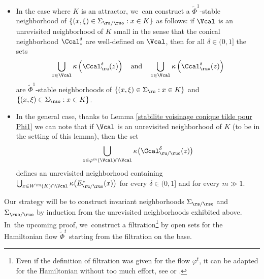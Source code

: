 \begin{itemize}
\item In the case where $K$ is an attractor, we~can construct a $\widetilde{\Phi}^1$-stable neighborhood of $\{(x,\xi)\in\Sigma_{\rs/\rso}: x\in K\}$ as follows: if $\Vcal$ is an unrevisited neighborhood of $K$ small in the sense that the conical neighborhood $\Ccal_*^{\delta}$ are well-defined on $\Vcal$, then for all $\delta\in(0,1]$ the sets
\[
\bigcup_{z \in \Vcal} \kappa \left(\Ccal_{\ru}^{\delta}(z) \right) \quad \text{and} \quad \bigcup_{z \in \Vcal} \kappa \left(\Ccal_{\ruo}^{\delta}(z) \right)
\]
are $\widetilde{\Phi}^1$-stable neighborhoods of $\{(x,\xi)\in\Sigma_{\rs}: x\in K\}$ and $\{(x,\xi)\in\Sigma_{\rso}: x\in K\}$.
\item In the general case, thanks to Lemma \ref{stabilite voisinage conique tilde pour Phi1} we can note that if $\Vcal$ is an unrevisited neighborhood of $K$ (to be in the setting of this lemma), then the set
\[
\bigcup_{z \in \varphi^m (\Vcal)\cap \Vcal} \kappa \bigl(\Ccal_{\ru/\ruo}^{\delta}(z) \bigr)
\]
defines an unrevisited neighborhood containing $\bigcup_{x \in W^\ru (K) \cap \Vcal } \kappa\bigl(E_{\ru/\ruo}^* (x) \bigr)$ for every $\delta\in(0,1]$ and for every $m \gg 1$.
\end{itemize}

Our strategy will be to construct invariant neighborhoods $\Sigma_{\rs/\rso}$ and $\Sigma_{\ruo/\ruo}$ by induction from the unrevisited neighborhoods exhibited above. In~the upcoming proof, we~construct a filtration\footnote{Even if the definition of filtration was given for the flow $\varphi^t$, it can be adapted for the Hamiltonian without too much effort, see \cite{shub} or \cite{smale}.} by open sets for the Hamiltonian flow $\widetilde{\Phi}^t$ starting from the filtration on the base.

